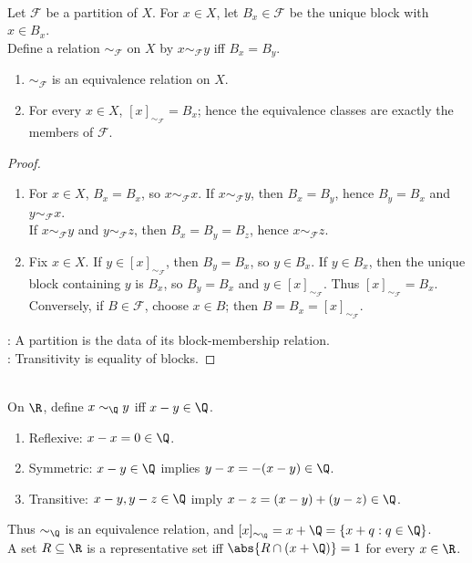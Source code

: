 \begin{proposition} \label{prop:partitions-determine-equivalence-relations} \\
Let $\mathcal{F}$ be a partition of $X$. For $x\in X$, let $B_x\in\mathcal{F}$ be the unique block with $x\in B_x$.\\
Define a relation $\sim_{\mathcal{F}}$ on $X$ by $x\sim_{\mathcal{F}}y$ iff $B_x=B_y$.
\begin{enumerate}[label=(\roman*)]
\setlength{\itemsep}{0pt}
\item $\sim_{\mathcal{F}}$ is an equivalence relation on $X$.
\item For every $x\in X$, $[x]_{\sim_{\mathcal{F}}}=B_x$; hence the equivalence classes are exactly the members of $\mathcal{F}$.
\end{enumerate}
\begin{proof}
\begin{enumerate}[label=(\roman*)]
\setlength{\itemsep}{0pt}
\item For $x\in X$, $B_x=B_x$, so $x\sim_{\mathcal{F}}x$. If $x\sim_{\mathcal{F}}y$, then $B_x=B_y$, hence $B_y=B_x$ and $y\sim_{\mathcal{F}}x$.\\
If $x\sim_{\mathcal{F}}y$ and $y\sim_{\mathcal{F}}z$, then $B_x=B_y=B_z$, hence $x\sim_{\mathcal{F}}z$.
\item Fix $x\in X$. If $y\in[x]_{\sim_{\mathcal{F}}}$, then $B_y=B_x$, so $y\in B_x$. If $y\in B_x$, then the unique block containing $y$ is $B_x$, so $B_y=B_x$ and $y\in[x]_{\sim_{\mathcal{F}}}$. Thus $[x]_{\sim_{\mathcal{F}}}=B_x$. Conversely, if $B\in\mathcal{F}$, choose $x\in B$; then $B=B_x=[x]_{\sim_{\mathcal{F}}}$.
\end{enumerate}
: A partition is the data of its block-membership relation.\\
: Transitivity is equality of blocks.
\end{proof}
\end{proposition}

\begin{example} \label{ex:rational-equivalence-classes-real-line} \\
On $\R$, define $x\sim_{\Q}y$ iff $x-y\in\Q$.
\begin{enumerate}[label=(\roman*)]
\setlength{\itemsep}{0pt}
\item Reflexive: $x-x=0\in\Q$.
\item Symmetric: $x-y\in\Q$ implies $y-x=-(x-y)\in\Q$.
\item Transitive: $x-y,y-z\in\Q$ imply $x-z=(x-y)+(y-z)\in\Q$.
\end{enumerate}
Thus $\sim_{\Q}$ is an equivalence relation, and $[x]_{\sim_{\Q}}=x+\Q=\{x+q:q\in\Q\}$.\\
A set $R\subseteq\R$ is a representative set iff $\abs{R\cap(x+\Q)}=1$ for every $x\in\R$.
\end{example}

